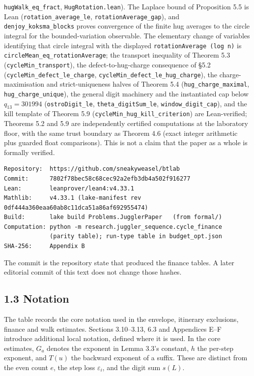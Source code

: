 \documentclass[12pt]{article}
\begin{document}
\texttt{\nolinkurl{hugWalk_eq_fract}},
\texttt{\nolinkurl{HugRotation.lean}}). The Laplace bound of Proposition
5.5 is Lean (\texttt{\nolinkurl{rotation_average_le}},
\texttt{\nolinkurl{rotationAverage_gap}}), and
\texttt{\nolinkurl{denjoy_koksma_blocks}} proves convergence of the
finite hug averages to the circle integral for the bounded-variation
observable. The elementary change of variables identifying that circle
integral with the displayed
\texttt{rotationAverage\ (log\ n\textquotesingle{})} is
\texttt{\nolinkurl{circleMean_eq_rotationAverage}}; the transport
inequality of Theorem 5.3 (\texttt{\nolinkurl{cycleMin_transport}}), the
defect-to-hug-charge consequence of §5.2
(\texttt{\nolinkurl{cycleMin_defect_le_charge}},
\texttt{\nolinkurl{cycleMin_defect_le_hug_charge}}), the
charge-maximisation and strict-uniqueness halves of Theorem 5.4
(\texttt{\nolinkurl{hug_charge_maximal}},
\texttt{\nolinkurl{hug_charge_unique}}), the general digit machinery and
the instantiated cap below \(q_{13}=301994\)
(\texttt{\nolinkurl{ostroDigit_le}},
\texttt{\nolinkurl{theta_digitSum_le}},
\texttt{\nolinkurl{window_digit_cap}}), and the kill template of Theorem
5.9 (\texttt{\nolinkurl{cycleMin_hug_kill_criterion}}) are
Lean-verified; Theorems 5.2 and 5.9 are independently certified
computations at the laboratory floor, with the same trust boundary as
Theorem 4.6 (exact integer arithmetic plus guarded float comparisons).
This is not a claim that the paper as a whole is formally verified.

\begin{verbatim}
Repository:  https://github.com/sneakyweasel/btlab
Commit:      7802f78bec58c68cec92a2efb3db4a502f916277
Lean:        leanprover/lean4:v4.33.1
Mathlib:     v4.33.1 (lake-manifest rev 0df444a360eaa60ab8c11dca51a86af692955474)
Build:       lake build Problems.JugglerPaper   (from formal/)
Computation: python -m research.juggler_sequence.cycle_finance
             (parity table); run-type table in budget_opt.json
SHA-256:     Appendix B
\end{verbatim}

The commit is the repository state that produced the finance tables. A
later editorial commit of this text does not change those hashes.

\subsection{1.3 Notation}\label{notation}

The table records the core notation used in the envelope, itinerary
exclusions, finance and walk estimates. Sections 3.10--3.13, 6.3 and
Appendices E--F introduce additional local notation, defined where it is
used. In the core estimates, \(G_a\) denotes the exponent in Lemma 3.3's
constant, \(h\) the per-step exponent, and \(T(u)\) the backward
exponent of a suffix. These are distinct from the even count \(e\), the
step loss \(\varepsilon_i\), and the digit sum \(s(L)\).
\end{document}
